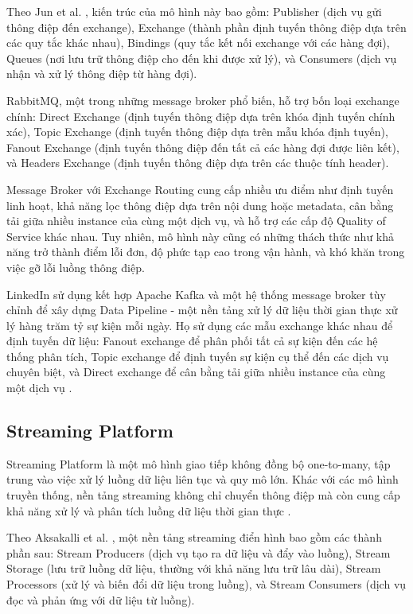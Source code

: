 Theo Jun et al. \cite{jun2018}, kiến trúc của mô hình này bao gồm: Publisher (dịch vụ gửi thông điệp đến exchange), Exchange (thành phần định tuyến thông điệp dựa trên các quy tắc khác nhau), Bindings (quy tắc kết nối exchange với các hàng đợi), Queues (nơi lưu trữ thông điệp cho đến khi được xử lý), và Consumers (dịch vụ nhận và xử lý thông điệp từ hàng đợi).

RabbitMQ, một trong những message broker phổ biến, hỗ trợ bốn loại exchange chính: Direct Exchange (định tuyến thông điệp dựa trên khóa định tuyến chính xác), Topic Exchange (định tuyến thông điệp dựa trên mẫu khóa định tuyến), Fanout Exchange (định tuyến thông điệp đến tất cả các hàng đợi được liên kết), và Headers Exchange (định tuyến thông điệp dựa trên các thuộc tính header).

Message Broker với Exchange Routing cung cấp nhiều ưu điểm như định tuyến linh hoạt, khả năng lọc thông điệp dựa trên nội dung hoặc metadata, cân bằng tải giữa nhiều instance của cùng một dịch vụ, và hỗ trợ các cấp độ Quality of Service khác nhau. Tuy nhiên, mô hình này cũng có những thách thức như khả năng trở thành điểm lỗi đơn, độ phức tạp cao trong vận hành, và khó khăn trong việc gỡ lỗi luồng thông điệp.

LinkedIn sử dụng kết hợp Apache Kafka và một hệ thống message broker tùy chỉnh để xây dựng Data Pipeline - một nền tảng xử lý dữ liệu thời gian thực xử lý hàng trăm tỷ sự kiện mỗi ngày. Họ sử dụng các mẫu exchange khác nhau để định tuyến dữ liệu: Fanout exchange để phân phối tất cả sự kiện đến các hệ thống phân tích, Topic exchange để định tuyến sự kiện cụ thể đến các dịch vụ chuyên biệt, và Direct exchange để cân bằng tải giữa nhiều instance của cùng một dịch vụ \cite{goodhope2012}.

\subsection{Streaming Platform}
Streaming Platform là một mô hình giao tiếp không đồng bộ one-to-many, tập trung vào việc xử lý luồng dữ liệu liên tục và quy mô lớn. Khác với các mô hình truyền thống, nền tảng streaming không chỉ chuyển thông điệp mà còn cung cấp khả năng xử lý và phân tích luồng dữ liệu thời gian thực \cite{richardson2019}.

Theo Aksakalli et al. \cite{aksakalli2021}, một nền tảng streaming điển hình bao gồm các thành phần sau: Stream Producers (dịch vụ tạo ra dữ liệu và đẩy vào luồng), Stream Storage (lưu trữ luồng dữ liệu, thường với khả năng lưu trữ lâu dài), Stream Processors (xử lý và biến đổi dữ liệu trong luồng), và Stream Consumers (dịch vụ đọc và phản ứng với dữ liệu từ luồng).

